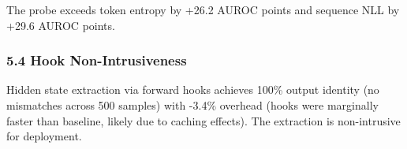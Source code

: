 \begin{table}[htbp]
\centering
{}
\end{table}

The probe exceeds token entropy by +26.2 AUROC points and sequence NLL by +29.6 AUROC points.

\subsubsection{5.4 Hook Non-Intrusiveness}

Hidden state extraction via forward hooks achieves 100\% output identity (no mismatches across 500 samples) with -3.4\% overhead (hooks were marginally faster than baseline, likely due to caching effects). The extraction is non-intrusive for deployment.

